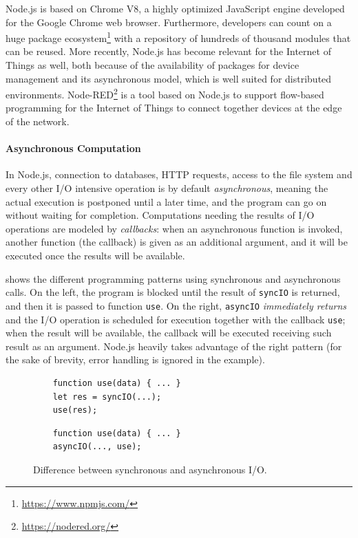 Node.js is based on Chrome V8, a highly optimized JavaScript engine developed for the Google Chrome web browser. 
Furthermore, developers can count on a huge package ecosystem\footnote{\url{https://www.npmjs.com/}} with a repository of hundreds of thousand modules that can be reused.
More recently, Node.js has become relevant for the Internet of Things as well, both because of the availability of packages for device management and its asynchronous model, which is well suited for distributed environments.
Node-RED\footnote{\url{https://nodered.org/}} is a tool based on Node.js to support flow-based programming for the Internet of Things to
connect together devices at the edge of the network.

\paragraph{Asynchronous Computation}
In Node.js, connection to databases, HTTP requests, access to the file system and every other I/O intensive operation is by default \emph{asynchronous}, meaning the actual execution is postponed until a later time, and the program can go on without waiting for completion.
Computations needing the results of I/O operations are modeled by \emph{callbacks}: when an asynchronous function is invoked, another function (the callback) is given as an additional argument, and it will be executed once the results will be available.

 shows the different programming patterns using synchronous and asynchronous calls.
On the left, the program is blocked until the result of \lstinline{syncIO} is returned, and then it is passed to function \lstinline{use}.
On the right, \lstinline{asyncIO} \emph{immediately returns} and the I/O operation is scheduled for execution together with the callback \lstinline{use}; when the result will be available, the callback will be executed receiving such result as an argument.
Node.js heavily takes advantage of the right pattern (for the sake of brevity, error handling is ignored in the example).

\begin{figure}[h]
\begin{minipage}{.5\textwidth}
\begin{lstlisting}
	function use(data) { ... }
	let res = syncIO(...);
	use(res);
\end{lstlisting}
\end{minipage}
\begin{minipage}{.5\textwidth}
	\begin{lstlisting}
	function use(data) { ... }
	asyncIO(..., use);
	\end{lstlisting}
\end{minipage}
\caption{Difference between synchronous and asynchronous I/O.}
\label{lst:async}
\end{figure}

